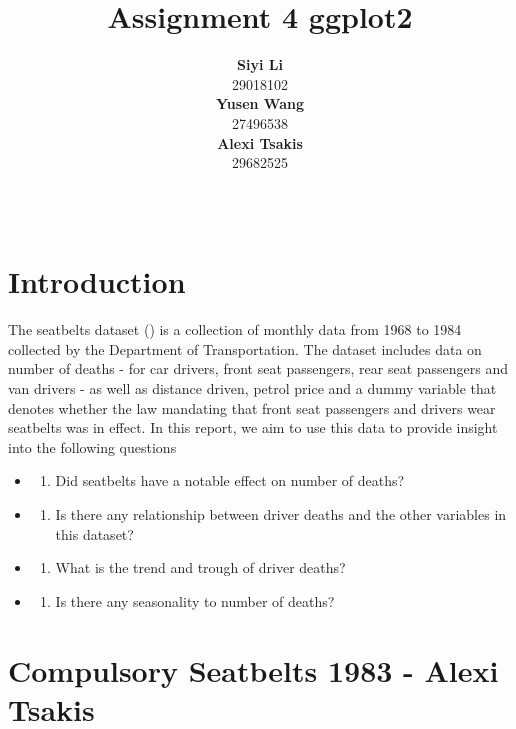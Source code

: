 \documentclass[11pt,a4paper,]{article}
\title{Assignment 4 ggplot2}
\author{\sf\Large\textbf{ Siyi Li}\\ {\sf\large 29018102\\[0.5cm]} \sf\Large\textbf{ Yusen Wang}\\ {\sf\large 27496538\\[0.5cm]} \sf\Large\textbf{ Alexi Tsakis}\\ {\sf\large 29682525\\[0.5cm]}}
\date{\sf\Date~\Month~\Year}
\makeatletter
\providecommand{\tightlist}{%
  \setlength{\itemsep}{0pt}\setlength{\parskip}{0pt}}
\def\titlepage{\front{\expandafter{\@title}}{\@author}{\@organization}}
\makeatother
\begin{document}
\titlepage

\clearpage

\hypertarget{introduction}{%
\section{Introduction}\label{introduction}}

The seatbelts dataset (\cite{seatbelts}) is a collection of monthly data from 1968 to 1984 collected by the Department of Transportation. The dataset includes data on number of deaths - for car drivers, front seat passengers, rear seat passengers and van drivers - as well as distance driven, petrol price and a dummy variable that denotes whether the law mandating that front seat passengers and drivers wear seatbelts was in effect. In this report, we aim to use this data to provide insight into the following questions

\begin{itemize}
\item
  \begin{enumerate}
  \def\labelenumi{\arabic{enumi})}
  \tightlist
  \item
    Did seatbelts have a notable effect on number of deaths?
  \end{enumerate}
\item
  \begin{enumerate}
  \def\labelenumi{\arabic{enumi})}
  \setcounter{enumi}{1}
  \tightlist
  \item
    Is there any relationship between driver deaths and the other variables in this dataset?
  \end{enumerate}
\item
  \begin{enumerate}
  \def\labelenumi{\arabic{enumi})}
  \setcounter{enumi}{2}
  \tightlist
  \item
    What is the trend and trough of driver deaths?
  \end{enumerate}
\item
  \begin{enumerate}
  \def\labelenumi{\arabic{enumi})}
  \setcounter{enumi}{3}
  \tightlist
  \item
    Is there any seasonality to number of deaths?
  \end{enumerate}
\end{itemize}

\hypertarget{compulsory-seatbelts-1983---alexi-tsakis}{%
\section{Compulsory Seatbelts 1983 - Alexi Tsakis}\label{compulsory-seatbelts-1983---alexi-tsakis}}
\end{document}
